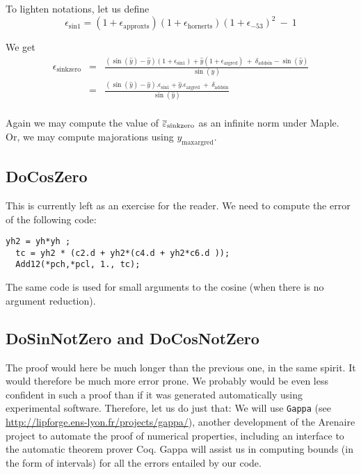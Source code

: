 To lighten notations, let us define 
\begin{equation}
 \epsilon_{\mathrm{sin1}} = (1+\epsilon_{\mathrm{approxts}})(1+\epsilon_{\mathrm{hornerts}})(1+\epsilon_{-53})^2 \ -\ 1
  \label{eq:epssin1}
\end{equation}

We get
\begin{eqnarray*}
  \epsilon_{\mathrm{sinkzero}} 
  &=& \frac{(\sin(\hat{y})-\hat{y})(1+\epsilon_{\mathrm{sin1}}) + \hat{y}(1+\epsilon_{\mathrm{argred}})    \ +\   \delta_{\mathrm{addsin}} - \sin(\hat{y})}{\sin(\hat{y})}\\
  &=& \frac{(\sin(\hat{y})-\hat{y}).\epsilon_{\mathrm{sin1}} + \hat{y}.\epsilon_{\mathrm{argred}}    \ +\ \delta_{\mathrm{addsin}}}{\sin(\hat{y})}\\
\label{eq:sinkzero}
\end{eqnarray*}

Again we may compute the value of ${\overline{\varepsilon}}_{\mathrm{sinkzero}}$ as an
infinite norm under Maple. Or, we may compute majorations using
$y_{\mathrm{maxargred}}$.

 

\subsection{DoCosZero}
This is currently left as an exercise for the reader. We need to
compute the error of the following code:
\begin{lstlisting}[caption={DoCosZero},firstnumber=1]
  yh2 = yh*yh ;                                   
  tc = yh2 * (c2.d + yh2*(c4.d + yh2*c6.d ));	  
  Add12(*pch,*pcl, 1., tc);		          
\end{lstlisting}

The same code is used for small arguments to the cosine (when there is
no argument reduction).

\subsection{DoSinNotZero and DoCosNotZero}

The proof would here be much longer than the previous one, in the same
spirit. It would therefore be much more error prone. We probably would
be even less confident in such a proof than if it was generated
automatically using experimental software. Therefore, let us do just
that: We will use \texttt{Gappa} (see
\url{http://lipforge.ens-lyon.fr/projects/gappa/}), another
development of the Arenaire project to automate the proof of numerical
properties, including an interface to the automatic theorem prover
Coq. Gappa will assist us in computing bounds (in the form of
intervals) for all the errors entailed by our code.


